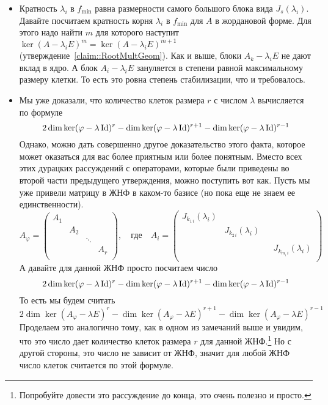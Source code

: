 \begin{itemize}
\item Кратность $\lambda_i$ в $f_\text{min}$ равна размерности самого большого блока вида $J_s(\lambda_i)$. Давайте посчитаем кратность корня $\lambda_i$ в $f_\text{min}$ для $A$ в жордановой форме. Для этого надо найти $m$ для которого наступит $\ker (A - \lambda_i E)^m = \ker(A-\lambda_i E)^{m+1}$ (утверждение~\ref{claim::RootMultGeom}). Как и выше, блоки $A_k - \lambda_i E$ не дают вклад в ядро. А блок $A_i - \lambda_i E$ зануляется в степени равной максимальному размеру клетки. То есть это ровна степень стабилизации, что и требовалось.

\item Мы уже доказали, что количество клеток размера $r$ с числом $\lambda$ вычисляется по формуле
\[
2\dim \ker (\varphi - \lambda\operatorname{Id})^r - \dim \ker (\varphi - \lambda\operatorname{Id})^{r+1} - \dim \ker (\varphi - \lambda\operatorname{Id})^{r-1}
\]
Однако, можно дать совершенно другое доказательство этого факта, которое может оказаться для вас более приятным или более понятным. Вместо всех этих дурацких рассуждений с операторами, которые были приведены во второй части предыдущего утверждения, можно поступить вот как. Пусть мы уже привели матрицу в ЖНФ в каком-то базисе (но пока еще не знаем ее единственности).
\[
A_\varphi = 
\begin{pmatrix}
{A_1}&{}&{}&{}\\
{}&{A_2}&{}&{}\\
{}&{}&{\ddots}&{}\\
{}&{}&{}&{A_r}\\
\end{pmatrix},
\quad\text{где}\quad
A_i = 
\begin{pmatrix}
{J_{k_{1\,i}}(\lambda_i)}&{}&{}&{}\\
{}&{J_{k_{2\,i}}(\lambda_i)}&{}&{}\\
{}&{}&{}&{}\\
{}&{}&{}&{J_{k_{m_i\,i}}(\lambda_i)}\\
\end{pmatrix}
\]
А давайте для данной ЖНФ просто посчитаем число 
\[
2\dim \ker (\varphi - \lambda\operatorname{Id})^r - \dim \ker (\varphi - \lambda\operatorname{Id})^{r+1} - \dim \ker (\varphi - \lambda\operatorname{Id})^{r-1}
\]
То есть мы будем считать
\[
2\dim \ker (A_\varphi - \lambda E)^r - \dim \ker (A_\varphi - \lambda E)^{r+1} - \dim \ker (A_\varphi - \lambda E)^{r-1}
\]
Проделаем это аналогично тому, как в одном из замечаний выше и увидим, что это число дает количество клеток размера $r$ для данной ЖНФ.\footnote{Попробуйте довести это рассуждение до конца, это очень полезно и просто.} Но с другой стороны, это число не зависит от ЖНФ, значит для любой ЖНФ число клеток считается по этой формуле.
\end{itemize}

